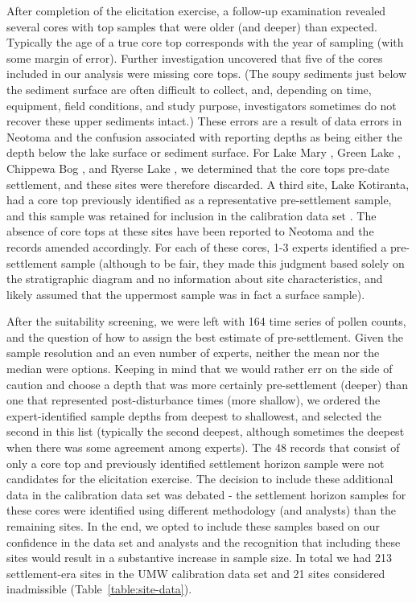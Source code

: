 \documentclass[12pt]{article}
\begin{document}
After completion of the elicitation exercise, a follow-up examination
revealed several cores with top samples that were older (and deeper)
than expected. Typically the age of a true core top corresponds with
the year of sampling (with some margin of error). Further
investigation uncovered that five of the cores included in our
analysis were missing core tops. (The soupy sediments just below the
sediment surface are often difficult to collect, and, depending on
time, equipment, field conditions, and study purpose, investigators
sometimes do not recover these upper sediments intact.) These errors
are a result of data errors in Neotoma and the confusion associated
with reporting depths as being either the depth below the lake surface
or sediment surface. For Lake Mary \citep{webb1971late}, Green Lake
\citep{lawrenz1975}, Chippewa Bog \citep{bailey1981late}, and Ryerse
Lake \citep{futyma1982postglacial}, we determined that the core tops
pre-date settlement, and these sites were therefore discarded. A third
site, Lake Kotiranta, had a core top previously identified as a
representative pre-settlement sample, and this sample was retained for
inclusion in the calibration data set \citep{wright1969}. The absence
of core tops at these sites have been reported to Neotoma and the
records amended accordingly. For each of these cores, 1-3 experts
identified a pre-settlement sample (although to be fair, they made
this judgment based solely on the stratigraphic diagram and no
information about site characteristics, and likely assumed that the
uppermost sample was in fact a surface sample).

After the suitability screening, we were left with 164 time series of
pollen counts, and the question of how to assign the best estimate of
pre-settlement. Given the sample resolution and an even number of
experts, neither the mean nor the median were options. Keeping in mind
that we would rather err on the side of caution and choose a depth
that was more certainly pre-settlement (deeper) than one that
represented post-disturbance times (more shallow), we ordered the
expert-identified sample depths from deepest to shallowest, and
selected the second in this list (typically the second deepest,
although sometimes the deepest when there was some agreement among
experts).  The 48 records that consist of only a core top and
previously identified settlement horizon sample were not candidates
for the elicitation exercise. The decision to include these additional
data in the calibration data set was debated - the settlement horizon
samples for these cores were identified using different methodology
(and analysts) than the remaining sites. In the end, we opted to
include these samples based on our confidence in the data set and
analysts and the recognition that including these sites would result
in a substantive increase in sample size. In total we had 213
settlement-era sites in the UMW calibration data set and 21 sites
considered inadmissible (Table~\ref{table:site-data}).
\end{document}
